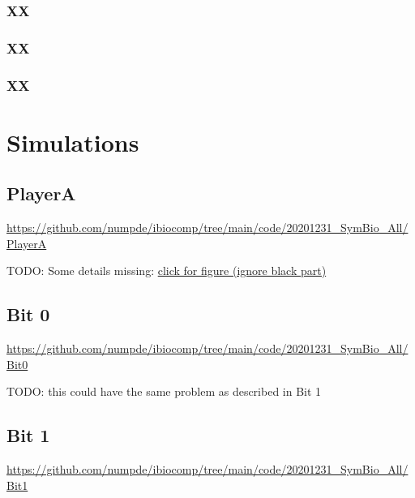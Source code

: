 \documentclass[12pt,notitlepage]{article}
\newcommand{\TODO}[1]{\textrm{\color{red}TODO: #1}}
\begin{document}
%

%




\subsubsection*{XX}



\subsubsection*{XX}


\subsubsection*{XX}



\section{Simulations}

\subsection{PlayerA}

\url{https://github.com/numpde/ibiocomp/tree/main/code/20201231_SymBio_All/PlayerA}

\TODO{Some details missing:
\href{https://drive.google.com/file/d/1X1uEVNkUiXZqNz7C7m36YjW-g1XctIH0}{click for figure (ignore black part)}}

\subsection{Bit 0}

\url{https://github.com/numpde/ibiocomp/tree/main/code/20201231_SymBio_All/Bit0}

\TODO{this could have the same problem as described in Bit 1}

\subsection{Bit 1}

\url{https://github.com/numpde/ibiocomp/tree/main/code/20201231_SymBio_All/Bit1}
\end{document}
